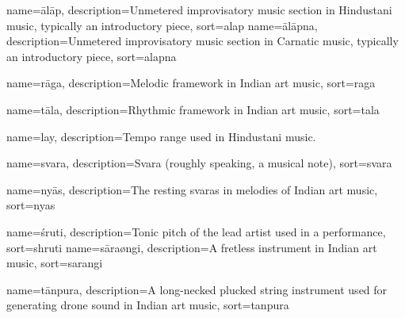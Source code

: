 
{
	name={\={a}l\={a}p},
	description={Unmetered improvisatory music section in Hindustani music, typically an introductory piece},
	sort=alap
}
{
	name={\={a}l\={a}pna},
	description={Unmetered improvisatory music section in Carnatic music, typically an introductory piece},
	sort=alapna
}

{
  name={r\={a}ga},
  description={Melodic framework in Indian art music},
  sort=raga
}

{
	name={t\={a}la},
	description={Rhythmic framework in Indian art music},
	sort=tala
}

{
	name={lay},
	description={Tempo range used in Hindustani music.}
}

{
	name={svara},
	description={Svara (roughly speaking, a musical note)},
	sort=svara
}


{
	name={ny\={a}s},
	description={The resting svaras in melodies of Indian art music},
	sort=nyas
}

{
	name={\'sruti},
	description={Tonic pitch of the lead artist used in a performance},
	sort=shruti
}
{
	name={s\={a}ra\o{n}gi},
	description={A fretless instrument in Indian art music},
	sort=sarangi
}

{
	name={t\={a}npura},
	description={A long-necked plucked string instrument used for generating drone sound in Indian art music},
	sort=tanpura
}

	
	
	
			
